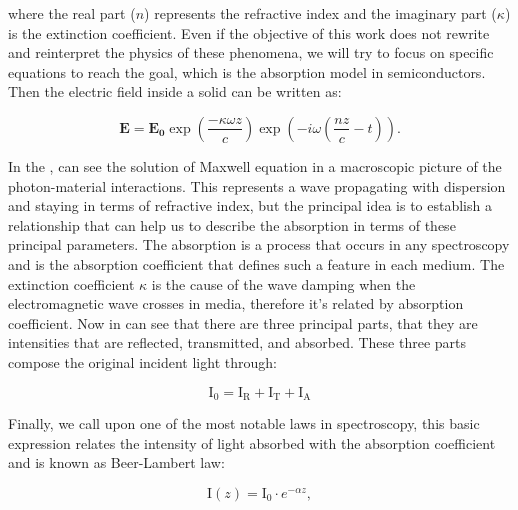 where the real part ($n$) represents the refractive index and the imaginary part ($\kappa$) is the extinction coefficient.  Even if the objective of this work does not rewrite and reinterpret the physics of these phenomena, we will try to focus on specific equations to reach the goal, which is the absorption model in semiconductors. Then the electric field inside a solid can be written as\cite{jimenez2016spectroscopic,lu2018spectroscopy,ball2001basicsspectroscopy}:  

\begin{equation}
	\mathbf{E} = \mathbf{E_0}\exp\left({\dfrac{-\kappa\omega  z}{c}}\right) \exp\left({-i\omega\left( \dfrac{nz}{c}-t\right)}\right).
    \label{eq:chapter-3-PL-electric-field-in-solid}
\end{equation}

 In the , can see the solution of Maxwell equation in a macroscopic picture of the photon-material interactions. This represents a wave propagating with dispersion and staying in terms of refractive index, but the principal idea is to establish a relationship that can help us to describe the absorption in terms of these principal parameters. The absorption is a process that occurs in any spectroscopy and is the absorption coefficient that defines such a feature in each medium. The extinction coefficient $\kappa$ is the cause of the wave damping when the electromagnetic wave crosses in media, therefore it's related by absorption coefficient. Now in  can see that there are three principal parts, that they are intensities that are reflected, transmitted, and absorbed. These three parts compose the original incident light through:
 
\begin{equation}
	\mathrm{I_0}=\mathrm{I_R}+\mathrm{I_T}+\mathrm{I_A}
	\label{eq:chapter-3-Intensities-of-light}
\end{equation}


Finally, we call upon one of the most notable laws in spectroscopy, this basic  expression relates the intensity of light absorbed with the absorption coefficient and is known as Beer-Lambert law\cite{demtreder2019electrodynamics,sole2005introductionspectroscopy}: 

\begin{equation}
	\mathrm{I}(z) = \mathrm{I_0}\cdot e^{-\alpha z},
	\label{eq:chapter-3-Beer-Lambert-Law}
\end{equation}

